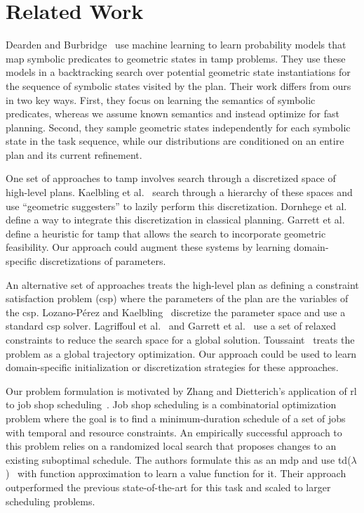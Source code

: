 \section{Related Work}
Dearden and Burbridge~\cite{deardenplanningtamp} use machine learning
to learn probability models that map symbolic predicates to
geometric states in {\sc tamp} problems. They use these models in a
backtracking search over potential geometric state instantiations for
the sequence of symbolic states visited by the plan.  Their work
differs from ours in two key ways. First, they focus on learning the
semantics of symbolic predicates, whereas we assume known semantics
and instead optimize for fast planning. Second, they sample geometric
states independently for each symbolic state in the task sequence,
while our distributions are conditioned on an entire plan and its
current refinement.

One set of approaches to {\sc tamp} involves search through a discretized space
of high-level plans. Kaelbling et al.~\cite{kaelbling2011hierarchical} search
through a hierarchy of these spaces and use ``geometric suggesters''
to lazily perform this discretization. Dornhege et
al.~\cite{dornhege2012semantic} define a way to integrate this
discretization in classical planning. Garrett et
al.~\cite{GarrettWAFR14} define a heuristic for {\sc tamp} that allows
the search to incorporate geometric feasibility. Our approach could
augment these systems by learning domain-specific discretizations of
parameters.

An alternative set of approaches treats the high-level plan as defining a
constraint satisfaction problem ({\sc csp}) where the parameters of the plan
are the variables of the {\sc csp}. Lozano-P{\'e}rez and
Kaelbling~\cite{lozano2014constraint} discretize the parameter space
and use a standard {\sc csp} solver. Lagriffoul et
al.~\cite{lagriffoul2014orientation} and Garrett et
al.~\cite{garrett2015backward} use a set of relaxed constraints to
reduce the search space for a global
solution. Toussaint~\cite{toussaint2015logic} treats the problem as a
global trajectory optimization. Our approach could be used to learn
domain-specific initialization or discretization strategies for these
approaches.

Our problem formulation is motivated by Zhang and Dietterich's
application of {\sc rl} to job shop
scheduling~\cite{JobShopSched}. Job shop scheduling is a combinatorial
optimization problem where the goal is to find a minimum-duration
schedule of a set of jobs with temporal and resource constraints. An
empirically successful approach to this problem relies on a randomized
local search that proposes changes to an existing suboptimal
schedule. The authors formulate this as an {\sc mdp} and use {\sc
  td}($\lambda$)~\cite{suttonbarto} with function approximation to
learn a value function for it. Their approach outperformed the
previous state-of-the-art for this task and scaled to larger scheduling
problems.

